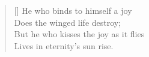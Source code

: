 \chapter*{}
\thispagestyle{empty}


\settowidth{\versewidth}{But he who kisses the joy as it flies}

\begin{verse}[\versewidth]
    He who binds to himself a joy \\
    Does the winged life destroy; \\
    But he who kisses the joy as it flies \\
    Lives in eternity's sun rise.
\end{verse}

